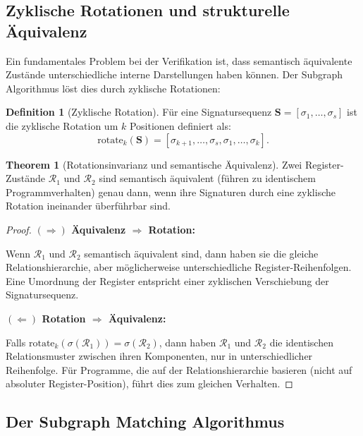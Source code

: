 \documentclass[a4paper,12pt]{article}
\theoremstyle{definition}
\newtheorem{theorem}{Theorem}
\newtheorem{definition}{Definition}
\begin{document}
\subsection{Zyklische Rotationen und strukturelle Äquivalenz}

Ein fundamentales Problem bei der Verifikation ist, dass semantisch äquivalente Zustände unterschiedliche interne Darstellungen haben können. Der Subgraph Algorithmus löst dies durch zyklische Rotationen:

\begin{definition}[Zyklische Rotation]
	Für eine Signatursequenz $\mathbf{S} = [\sigma_1, \ldots, \sigma_s]$ ist die zyklische Rotation um $k$ Positionen definiert als:
	\[
	\text{rotate}_k(\mathbf{S}) = [\sigma_{k+1}, \ldots, \sigma_s, \sigma_1, \ldots, \sigma_k].
	\]
\end{definition}

\begin{theorem}[Rotationsinvarianz und semantische Äquivalenz]
	\label{thm:rotation_equivalence}
	Zwei Register-Zustände $\mathcal{R}_1$ und $\mathcal{R}_2$ sind semantisch äquivalent (führen zu identischem Programmverhalten) genau dann, wenn ihre Signaturen durch eine zyklische Rotation ineinander überführbar sind.
\end{theorem}

\begin{proof}
	\textbf{$(\Rightarrow)$ Äquivalenz $\Rightarrow$ Rotation:}
	
	Wenn $\mathcal{R}_1$ und $\mathcal{R}_2$ semantisch äquivalent sind, dann haben sie die gleiche Relationshierarchie, aber möglicherweise unterschiedliche Register-Reihenfolgen. Eine Umordnung der Register entspricht einer zyklischen Verschiebung der Signatursequenz.
	
	\textbf{$(\Leftarrow)$ Rotation $\Rightarrow$ Äquivalenz:}
	
	Falls $\text{rotate}_k(\sigma(\mathcal{R}_1)) = \sigma(\mathcal{R}_2)$, dann haben $\mathcal{R}_1$ und $\mathcal{R}_2$ die identischen Relationsmuster zwischen ihren Komponenten, nur in unterschiedlicher Reihenfolge. Für Programme, die auf der Relationshierarchie basieren (nicht auf absoluter Register-Position), führt dies zum gleichen Verhalten.
\end{proof}

\subsection{Der Subgraph Matching Algorithmus}
\end{document}
